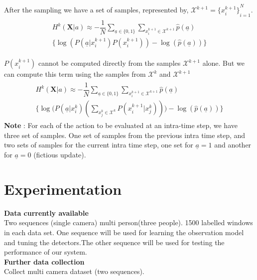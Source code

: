 \documentclass[10pt,twocolumn,letterpaper]{article}
\begin{document}
After the sampling we have a set of samples, represented by,
 $\mathcal{X}^{k+1}={\lbrace x^{k+1}_{i}\rbrace}^{N}_{i=1}$.
\begin{align}
\begin{split}
H^{k}(\textbf{X}| a)\approx -\dfrac{1}{N}\sum_{\underline{a}\in\lbrace 0 ,1 \rbrace} \sum_{x_{i}^{k+1}\in\mathcal{X}^{k+1}} \widehat{p}( \underline{a})\\ \Big\lbrace\log(P( \underline{a}|x^{k+1}_{i})P(x^{k+1}_{i})) - \log(\widehat{p}( \underline{a}))\Big\rbrace
\end{split}
\end{align}

$P(x^{k+1}_{i})$ cannot be computed directly from the samples $\mathcal{X}^{k+1}$ alone. But we can compute this term using the samples from $\mathcal{X}^{k}$ and $\mathcal{X}^{k+1}$
\begin{align}
\begin{split}
H^{k}(\textbf{X}| a)\approx -\dfrac{1}{N}\sum_{\underline{a}\in\lbrace 0 ,1 \rbrace} \sum_{x_{i}^{k+1}\in\mathcal{X}^{k+1}} \widehat{p}( \underline{a}) \\ \Big\lbrace\log\Big(P( \underline{a}|x^{k}_{i})(\sum_{x_{j}^{k}\in\mathcal{X}^{k}}P(x^{k+1}_{i}|x^{k}_{j}))\Big) - \log(\widehat{p}( \underline{a}))\Big\rbrace
\end{split}
\end{align}
\textbf{Note} :
For each of the action to be evaluated at an intra-time step, we have three set of samples. One set of samples from the previous intra time step, and two sets of samples for the current intra time step, one set for $\underline{a}=1$ and another for $\underline{a}=0$ (fictious update).
  
\section{Experimentation} \label{sec:exp}

\textbf{Data currently available}\\ 
Two sequences (single camera) multi person(three people). 1500 labelled windows in each data set. One sequence will be used for learning the observation model and tuning the detectors.The other sequence will be used for testing the performance of our system.\\

\textbf{Further data collection}\\
Collect multi camera dataset (two sequences).\\
\end{document}
